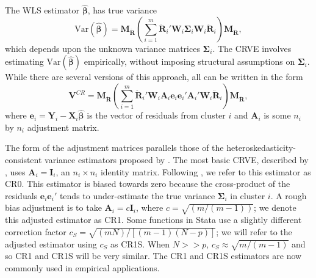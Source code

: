 \documentclass[12pt]{article}\usepackage[]{graphicx}\usepackage[]{color}
\newcommand{\Var}{\text{Var}}
\newcommand{\bm}{\mathbf}
\newcommand{\bs}{\boldsymbol}
\begin{document}
The WLS estimator $\bs{\hat\beta}$, has true variance
\begin{equation}
\label{eq:var_WLS}
\Var\left(\bs{\hat\beta}\right) = \bm{M_{\ddot{R}}}\left(\sum_{i=1}^m \bm{\ddot{R}}_i' \bm{W}_i \bs\Sigma_i \bm{W}_i\bm{\ddot{R}}_i\right) \bm{M_{\ddot{R}}},
\end{equation}
which depends upon the unknown variance matrices $\bs\Sigma_i$. 
The CRVE involves estimating $\Var\left(\bs{\hat\beta}\right)$ empirically, without imposing structural assumptions on $\bs\Sigma_i$. 
While there are several versions of this approach, all can be written in the form
\begin{equation}
\label{eq:V_small}
\bm{V}^{CR} = \bm{M_{\ddot{R}}}\left(\sum_{i=1}^m \bm{\ddot{R}}_i'\bm{W}_i \bm{A}_i \bm{e}_i \bm{e}_i' \bm{A}_i' \bm{W}_i \bm{\ddot{R}}_i\right) \bm{M_{\ddot{R}}},
\end{equation}
where $\bm{e}_i = \bm{Y}_i - \bm{X}_i \bs{\hat\beta}$ is the vector of residuals from cluster $i$ and $\bm{A}_i$ is some $n_i$ by $n_i$ adjustment matrix. 

The form of the adjustment matrices parallels those of the heteroskedasticity-consistent variance estimators proposed by \citet*{MacKinnon1985some}. 
The most basic CRVE, described by \citet{Liang1986longitudinal}, uses $\bm{A}_i = \bm{I}_i$, an $n_i \times n_i$ identity matrix. 
Following \citet{Cameron2015practitioners}, we refer to this estimator as CR0. 
This estimator is biased towards zero because the cross-product of the residuals $\bm{e}_i \bm{e}_i'$ tends to under-estimate the true variance $\bs\Sigma_i$ in cluster $i$.
A rough bias adjustment is to take $\bm{A}_i = c\bm{I}_i$, where $c = \sqrt{(m/(m-1))}$; we denote this adjusted estimator as CR1. Some functions in Stata use a slightly different correction factor $c_S = \sqrt{(m N)/[(m - 1)(N - p)]}$; we will refer to the adjusted estimator using $c_S$ as CR1S. When $N >> p$, $c_S \approx \sqrt{m/(m-1)}$ and so CR1 and CR1S will be very similar.
The CR1 and CR1S estimators are now commonly used in empirical applications.
\end{document}
